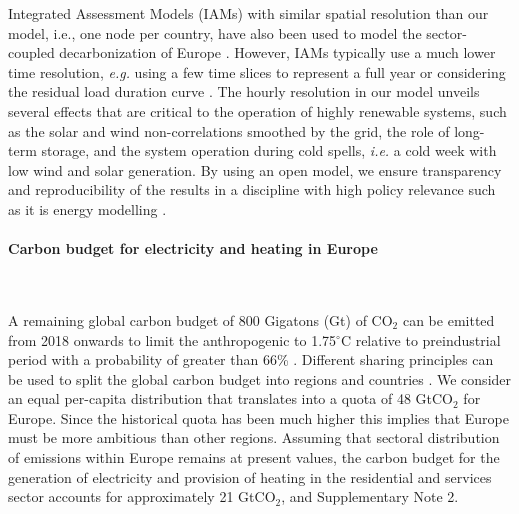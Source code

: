 \documentclass[5p]{elsarticle} %
\begin{document}
Integrated Assessment Models (IAMs) with similar spatial resolution than our model, i.e., one node per country, have also been used to model the sector-coupled decarbonization of Europe \cite{in-depth_2018, JRC-EU-TIMES, Creutzig_2017}. However, IAMs typically use a much lower time resolution, \textit{e.g.} using a few time slices to represent a full year \cite{JRC-EU-TIMES, Loffler_2019, Poncelet_2016, McGlade_2015, Babrowski_2014} or considering the residual load duration curve \cite{Creutzig_2017, Ueckerdt_2017}. The hourly resolution in our model unveils several effects that are critical to the operation of highly renewable systems, such as the solar and wind non-correlations smoothed by the grid, the role of long-term storage, and the system operation during cold spells, \textsl{i.e.} a cold week with low wind and solar generation. By using an open model, we ensure transparency and reproducibility of the results in a  discipline with high policy relevance such as it is energy modelling \cite{Pfenninger_2017, Pfenninger_2018}. 

\paragraph{\textbf{Carbon budget for electricity and heating in Europe}} \

A remaining global carbon budget of 800 Gigatons (Gt) of CO$_2$ can be emitted from 2018 onwards to limit the anthropogenic to 1.75$^{\circ}$C relative to preindustrial period with a probability of greater than 66\% \cite{IPCC_1.5}. Different sharing principles can be used to split the global carbon budget into regions and countries \cite{Raupach_2014}. We consider an equal per-capita distribution that translates into a quota of 48 GtCO$_2$ for Europe. Since the historical quota has been much higher this implies that Europe must be more ambitious than other regions. Assuming that sectoral distribution of emissions within Europe remains at present values, the carbon budget for the generation of electricity and provision of heating in the residential and services sector accounts for approximately 21 GtCO$_2$, \cite{UNFCCC_inventory} and Supplementary Note 2. %
\end{document}
